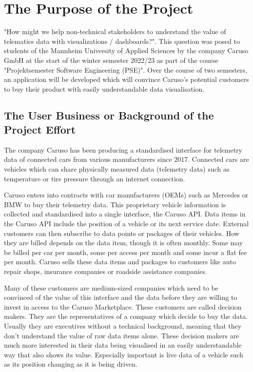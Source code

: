 \chapter{The Purpose of the Project}
"How might we help non-technical stakeholders to understand the value of telematics data with visualizations / dashboards?". This question was posed to students of the Mannheim University of Applied Sciences by the company Caruso GmbH at the start of the winter semester 2022/23 as part of the course "Projektsemester Software Engineering (PSE)". Over the course of two semesters, an application will be developed which will convince Caruso's potential customers to buy their product with easily understandable data visualisation.

\section{The User Business or Background of the Project Effort}
The company Caruso has been producing a standardised interface for telemetry data of connected cars from various manufacturers since 2017. Connected cars are vehicles which can share physically measured data (telemetry data) such as temperature or tire pressure through an internet connection.

Caruso enters into contracts with car manufacturers (OEMs) such as Mercedes or BMW to buy their telemetry data. This proprietary vehicle information is collected and standardised into a single interface, the Caruso API. Data items in the Caruso API include the position of a vehicle or its next service date. External customers can then subscribe to data points or packages of their vehicles. How they are billed depends on the data item, though it is often monthly. Some may be billed per car per month, some per access per month and some incur a flat fee per month. Caruso sells these data items and packages to customers like auto repair shops, insurance companies or roadside assistance companies. 

Many of these customers are medium-sized companies which need to be convinced of the value of this interface and the data before they are willing to invest in access to the Caruso Marketplace. These customers are called decision makers. They are the representatives of a company which decide to buy the data. Usually they are executives without a technical background, meaning that they don't understand the value of raw data items alone. These decision makers are much more interested in their data being visualised in an easily understandable way that also shows its value. Especially important is live data of a vehicle such as its position changing as it is being driven.

